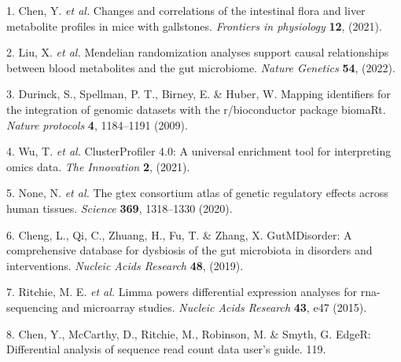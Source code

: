 \documentclass[
]{article}
\newenvironment{cslreferences}%
  {}%
  {\par}
\begin{document}
\hypertarget{refs}{}
\begin{cslreferences}
\leavevmode\hypertarget{ref-ChangesAndCorChen2021}{}%
1. Chen, Y. \emph{et al.} Changes and correlations of the intestinal flora and liver metabolite profiles in mice with gallstones. \emph{Frontiers in physiology} \textbf{12}, (2021).

\leavevmode\hypertarget{ref-MendelianRandoLiuX2022}{}%
2. Liu, X. \emph{et al.} Mendelian randomization analyses support causal relationships between blood metabolites and the gut microbiome. \emph{Nature Genetics} \textbf{54}, (2022).

\leavevmode\hypertarget{ref-MappingIdentifDurinc2009}{}%
3. Durinck, S., Spellman, P. T., Birney, E. \& Huber, W. Mapping identifiers for the integration of genomic datasets with the r/bioconductor package biomaRt. \emph{Nature protocols} \textbf{4}, 1184--1191 (2009).

\leavevmode\hypertarget{ref-ClusterprofilerWuTi2021}{}%
4. Wu, T. \emph{et al.} ClusterProfiler 4.0: A universal enrichment tool for interpreting omics data. \emph{The Innovation} \textbf{2}, (2021).

\leavevmode\hypertarget{ref-TheGtexConsorNone2020}{}%
5. None, N. \emph{et al.} The gtex consortium atlas of genetic regulatory effects across human tissues. \emph{Science} \textbf{369}, 1318--1330 (2020).

\leavevmode\hypertarget{ref-GutmdisorderACheng2019}{}%
6. Cheng, L., Qi, C., Zhuang, H., Fu, T. \& Zhang, X. GutMDisorder: A comprehensive database for dysbiosis of the gut microbiota in disorders and interventions. \emph{Nucleic Acids Research} \textbf{48}, (2019).

\leavevmode\hypertarget{ref-LimmaPowersDiRitchi2015}{}%
7. Ritchie, M. E. \emph{et al.} Limma powers differential expression analyses for rna-sequencing and microarray studies. \emph{Nucleic Acids Research} \textbf{43}, e47 (2015).

\leavevmode\hypertarget{ref-EdgerDifferenChen}{}%
8. Chen, Y., McCarthy, D., Ritchie, M., Robinson, M. \& Smyth, G. EdgeR: Differential analysis of sequence read count data user's guide. 119.
\end{cslreferences}
\end{document}
